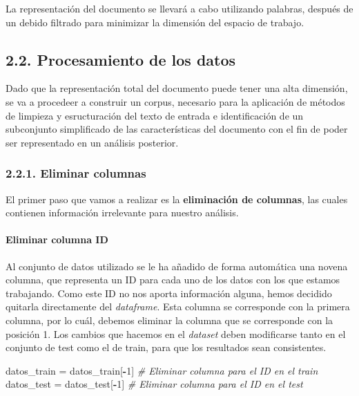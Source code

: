 \documentclass[spanish,]{article}
\newenvironment{Shaded}{\begin{snugshade}}{\end{snugshade}}
\newcommand{\DecValTok}[1]{\textcolor[rgb]{0.00,0.00,0.81}{#1}}
\newcommand{\StringTok}[1]{\textcolor[rgb]{0.31,0.60,0.02}{#1}}
\newcommand{\CommentTok}[1]{\textcolor[rgb]{0.56,0.35,0.01}{\textit{#1}}}
\newcommand{\OperatorTok}[1]{\textcolor[rgb]{0.81,0.36,0.00}{\textbf{#1}}}
\newcommand{\NormalTok}[1]{#1}
\let\oldparagraph\paragraph
\renewcommand{\paragraph}[1]{\oldparagraph{#1}\mbox{}}
\begin{document}
La representación del documento se llevará a cabo utilizando palabras,
después de un debido filtrado para minimizar la dimensión del espacio de
trabajo.

\subsection{2.2. Procesamiento de los
datos}\label{procesamiento-de-los-datos}

Dado que la representación total del documento puede tener una alta
dimensión, se va a procedeer a construir un corpus, necesario para la
aplicación de métodos de limpieza y esructuración del texto de entrada e
identificación de un subconjunto simplificado de las características del
documento con el fin de poder ser representado en un análisis posterior.

\subsubsection{2.2.1. Eliminar columnas}\label{eliminar-columnas}

El primer paso que vamos a realizar es la \textbf{eliminación de
columnas}, las cuales contienen información irrelevante para nuestro
análisis.

\paragraph{Eliminar columna ID}\label{eliminar-columna-id}

Al conjunto de datos utilizado se le ha añadido de forma automática una
novena columna, que representa un ID para cada uno de los datos con los
que estamos trabajando. Como este ID no nos aporta información alguna,
hemos decidido quitarla directamente del \emph{dataframe}. Esta columna
se corresponde con la primera columna, por lo cuál, debemos eliminar la
columna que se corresponde con la posición 1. Los cambios que hacemos en
el \emph{dataset} deben modificarse tanto en el conjunto de test como el
de train, para que los resultados sean consistentes.

\begin{Shaded}
\begin{Highlighting}[]
\NormalTok{datos_train =}\StringTok{ }\NormalTok{datos_train[}\OperatorTok{-}\DecValTok{1}\NormalTok{] }\CommentTok{# Eliminar columna para el ID en el train}
\NormalTok{datos_test =}\StringTok{ }\NormalTok{datos_test[}\OperatorTok{-}\DecValTok{1}\NormalTok{] }\CommentTok{# Eliminar columna para el ID en el test}
\end{Highlighting}
\end{Shaded}
\end{document}
